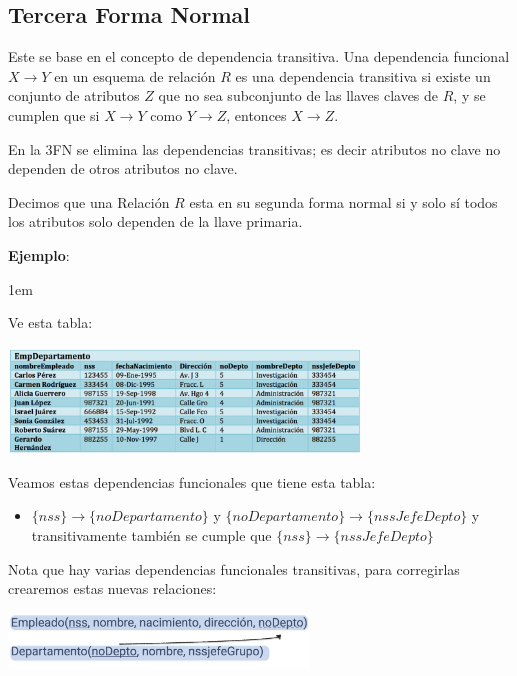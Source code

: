 \documentclass[12pt, fleqn]{report}                             %
\newenvironment{SmallIndentation}[1][0.75em]                    %
        {\begin{adjustwidth}{#1}{}\begin{footnotesize}}             %
        {\end{footnotesize}\end{adjustwidth}}                       %
\theoremstyle{break}                                            %
\newcommand \lLongTo {\longrightarrow}                          %
\begin{document}
            \clearpage
            \subsection{Tercera Forma Normal}

                Este se base en el concepto de dependencia transitiva.
                Una dependencia funcional $X \lLongTo Y$ en un esquema de relación $R$
                es una dependencia transitiva si existe un conjunto de atributos $Z$
                que no sea subconjunto de las llaves claves de $R$, y se cumplen
                que si $X \lLongTo Y$ como $Y \lLongTo Z$, entonces $X \lLongTo Z$.

                En la 3FN se elimina las dependencias transitivas; es decir atributos no
                clave no dependen de otros atributos no clave.

                Decimos que una Relación $R$ esta en su segunda forma normal
                si y solo sí todos los atributos solo dependen de la llave primaria. 


                \textbf{Ejemplo}:
                \begin{SmallIndentation}[1em]

                    Ve esta tabla:

                    \includegraphics[width=0.70\textwidth]{EjemploParaNormalizarA3FN}
                    
                    Veamos estas dependencias funcionales que tiene esta tabla:
                    \begin{itemize}
                        \item $\{nss\} \to \{noDepartamento\}$ y $\{noDepartamento\} \to \{nssJefeDepto\}$ 
                            y transitivamente también se cumple que $\{nss\} \to \{nssJefeDepto\}$
                    \end{itemize}

                    Nota que hay varias dependencias funcionales transitivas, para corregirlas crearemos
                    estas nuevas relaciones:

                    \includegraphics[width=0.60\textwidth]{EjemploParaNormalizarA3FN2}

                \end{SmallIndentation}
\end{document}
